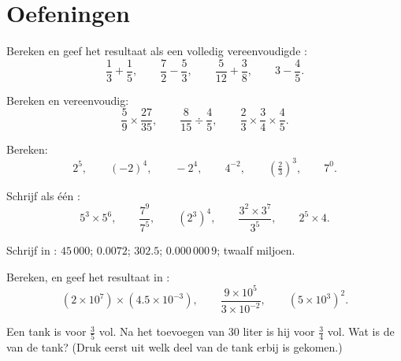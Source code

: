 \section{Oefeningen}

\begin{exercise}[$\star$]\label{exo:g9:fractions:1}
Bereken en geef het resultaat als een volledig vereenvoudigde :
\[
\frac13 + \frac15, \qquad
\frac72 - \frac53, \qquad
\frac{5}{12} + \frac38, \qquad
3 - \frac45 .
\]
\end{exercise}

\begin{exercise}[$\star$]\label{exo:g9:fractions:2}
Bereken en vereenvoudig:
\[
\frac59 \times \frac{27}{35}, \qquad
\frac{8}{15} \div \frac{4}{5}, \qquad
\frac23 \times \frac34 \times \frac45 .
\]
\end{exercise}

\begin{exercise}[$\star$]\label{exo:g9:fractions:3}
Bereken:
\[
2^5, \qquad (-2)^4, \qquad -2^4, \qquad 4^{-2}, \qquad
\left(\tfrac23\right)^3, \qquad 7^0 .
\]
\end{exercise}

\begin{exercise}[$\star$]\label{exo:g9:fractions:4}
Schrijf als één :
\[
5^3 \times 5^6, \qquad
\frac{7^9}{7^5}, \qquad
\left(2^3\right)^4, \qquad
\frac{3^2 \times 3^7}{3^5}, \qquad
2^5 \times 4 .
\]
\end{exercise}

\begin{exercise}[$\star$]\label{exo:g9:fractions:5}
Schrijf in : $45\,000$; $0.0072$; $302.5$;
$0.000\,000\,9$; twaalf miljoen.
\end{exercise}

\begin{exercise}[$\star\star$]\label{exo:g9:fractions:6}
Bereken, en geef het resultaat in :
\[
(2 \times 10^7) \times (4.5 \times 10^{-3}),
\qquad
\frac{9 \times 10^5}{3 \times 10^{-2}},
\qquad
(5 \times 10^3)^2 .
\]
\end{exercise}

\begin{exercise}[$\star\star$]\label{exo:g9:fractions:7}
Een tank is voor $\frac35$ vol. Na het toevoegen van $30$ liter is hij voor
$\frac34$ vol. Wat is de  van de tank? (Druk eerst uit welk deel van de tank
erbij is gekomen.)
\end{exercise}

